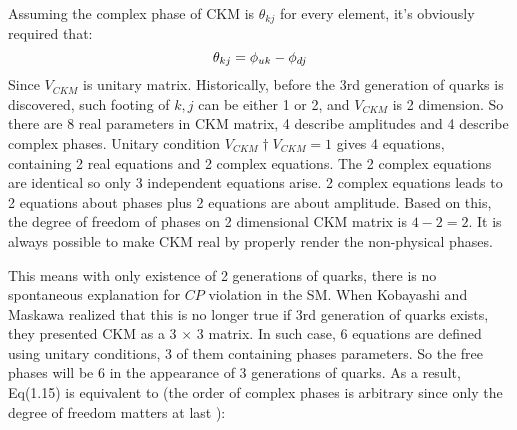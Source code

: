 Assuming the complex phase of CKM is $\theta_{kj}$ for every element, it's obviously required that:
\begin{equation}
\large
\theta_{kj} = \phi_{uk}-\phi_{dj}
\end{equation}
Since $V_{CKM}$ is unitary matrix. Historically, before the 3rd generation of quarks is discovered, such footing of $k,j$ can be either 1 or 2, and $V_{CKM}$ is 2 dimension. So there are 8 real parameters in CKM matrix, 4 describe amplitudes and 4 describe complex phases. Unitary condition $V_{CKM}{\dag} V_{CKM} = 1$ gives 4 equations, containing 2 real equations and 2 complex equations. The 2 complex equations are identical so only 3 independent equations arise.
2 complex equations leads to 2 equations about phases plus 2 equations are about amplitude. Based on this, the degree of freedom of phases on 2 dimensional CKM matrix is $4-2=2$. It is always possible to make CKM real by properly render the non-physical phases.
\iffalse
Assuming the free phases are $\theta_{11}$ and $\theta_{22}$.Eq(2.15) presents: 
\begin{equation}
\large
\begin{pmatrix}
\theta_{11}\\
\theta_{22}
\end{pmatrix}
=
\begin{pmatrix}
1&-1&0&0\\
0&0&1&-1
\end{pmatrix}
\begin{pmatrix}
\phi_{u1} \\
\phi_{d1} \\
\phi_{u2} \\
\phi_{d2}
\end{pmatrix}
\end{equation}.
which is always render-able by properly choosing non-physical phases. 
\fi
This means with only existence of 2 generations of quarks, there is no spontaneous explanation for $CP$ violation in the SM. When Kobayashi and Maskawa realized that this is no longer true if 3rd generation of quarks exists, they presented CKM as a 3 $\times$ 3 matrix. In such case, 6 equations are defined using unitary conditions, 3 of them containing phases parameters. So the free phases will be 6 in the appearance of 3 generations of quarks. As a result, Eq(1.15) is equivalent to (the order of complex phases is arbitrary since only the degree of freedom matters at last ): 

